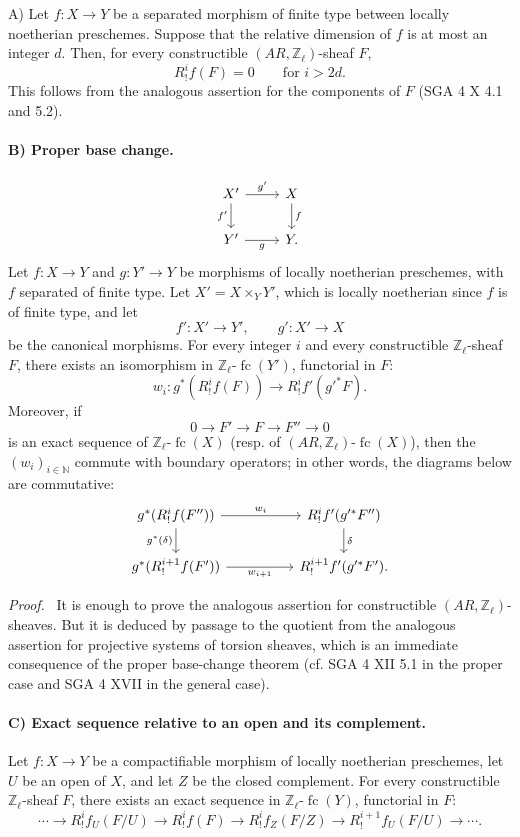 \documentclass[11pt]{article}
\newenvironment{prooftext}[1][Proof]{\par\noindent\emph{#1.}\ }{\par\medskip}
\providecommand{\fc}{\operatorname{fc}}
\begin{document}
A) Let \(f:X\to Y\) be a separated morphism of finite type between locally noetherian preschemes. Suppose that the relative dimension of \(f\) is at most an integer \(d\). Then, for every constructible \((AR,\mathbb Z_\ell)\)-sheaf \(F\),
\[
R^i_!f(F)=0\qquad\text{for }i>2d.
\]
This follows from the analogous assertion for the components of \(F\) (SGA 4 X 4.1 and 5.2).

\paragraph{B) Proper base change.}
\[
\begin{tikzcd}
X' \arrow[r,"g'"] \arrow[d,"f'"'] & X \arrow[d,"f"]\\
Y' \arrow[r,"g"'] & Y .
\end{tikzcd}
\]
Let \(f:X\to Y\) and \(g:Y'\to Y\) be morphisms of locally noetherian preschemes, with \(f\) separated of finite type. Let \(X'=X\times_Y Y'\), which is locally noetherian since \(f\) is of finite type, and let
\[
f':X'\to Y',\qquad g':X'\to X
\]
be the canonical morphisms. For every integer \(i\) and every constructible \(\mathbb Z_\ell\)-sheaf \(F\), there exists an isomorphism in \(\mathbb Z_\ell\text{-}\fc(Y')\), functorial in \(F\):
\[
w_i:g^*(R^i_!f(F))\longrightarrow R^i_!f'(g'^*F).
\]
Moreover, if
\[
0\longrightarrow F'\longrightarrow F\longrightarrow F''\longrightarrow 0
\]
is an exact sequence of \(\mathbb Z_\ell\text{-}\fc(X)\) (resp. of \((AR,\mathbb Z_\ell)\text{-}\fc(X)\)), then the \((w_i)_{i\in\mathbb N}\) commute with boundary operators; in other words, the diagrams below are commutative:
\[
\begin{tikzcd}[column sep=huge]
g^*(R^i_!f(F'')) \arrow[r,"w_i"] \arrow[d,"g^*(\delta)"']
&
R^i_!f'(g'^*F'') \arrow[d,"\delta"]\\
g^*(R^{i+1}_!f(F')) \arrow[r,"w_{i+1}"']
&
R^{i+1}_!f'(g'^*F').
\end{tikzcd}
\]

\begin{prooftext}[Proof]
It is enough to prove the analogous assertion for constructible \((AR,\mathbb Z_\ell)\)-sheaves. But it is deduced by passage to the quotient from the analogous assertion for projective systems of torsion sheaves, which is an immediate consequence of the proper base-change theorem (cf. SGA 4 XII 5.1 in the proper case and SGA 4 XVII in the general case).
\end{prooftext}

\paragraph{C) Exact sequence relative to an open and its complement.}
Let \(f:X\to Y\) be a compactifiable morphism of locally noetherian preschemes, let \(U\) be an open of \(X\), and let \(Z\) be the closed complement. For every constructible \(\mathbb Z_\ell\)-sheaf \(F\), there exists an exact sequence in \(\mathbb Z_\ell\text{-}\fc(Y)\), functorial in \(F\):
\[
\cdots\longrightarrow R^i_!f_U(F/U)
\longrightarrow R^i_!f(F)
\longrightarrow R^i_!f_Z(F/Z)
\longrightarrow R^{i+1}_!f_U(F/U)
\longrightarrow\cdots .
\]
\end{document}
